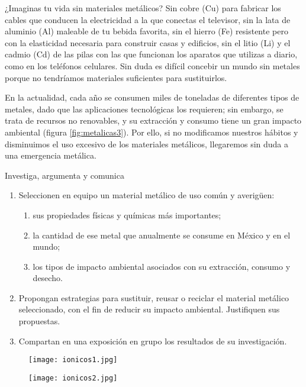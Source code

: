 ¿Imaginas tu vida sin materiales metálicos? Sin cobre (Cu) para fabricar los cables que conducen la
electricidad a la que conectas el televisor, sin la lata de aluminio (Al) maleable de tu bebida
favorita, sin el hierro (Fe) resistente pero con la elasticidad necesaria para construir casas y
edificios, sin el litio (Li) y el cadmio (Cd) de las pilas con las que funcionan los aparatos que
utilizas a diario, como en los teléfonos celulares. Sin duda es difícil concebir un mundo sin metales
porque no tendríamos materiales suficientes para sustituirlos.

En la actualidad, cada año se consumen miles de toneladas de diferentes tipos de metales,
dado que las aplicaciones tecnológicas los requieren; sin embargo, se trata de recursos
no renovables, y su extracción y consumo tiene un gran impacto ambiental (figura \ref{fig:metalicas3}).
Por ello, si no modificamos nuestros hábitos y disminuimos el uso excesivo de los materiales metálicos,
llegaremos sin duda a una emergencia metálica.\\

\noindent
\begin{boxK}
    Investiga, argumenta y comunica
    \begin{enumerate}
        \item Seleccionen en equipo un material metálico de uso común y averigüen:
              \begin{enumerate}
                  \item sus propiedades físicas y químicas más importantes;
                  \item la cantidad de ese metal que anualmente se consume en México y en el mundo;
                  \item los tipos de impacto ambiental asociados con su extracción, consumo y desecho.
              \end{enumerate}
        \item Propongan estrategias para sustituir, reusar o reciclar el material metálico seleccionado,
              con el fin de reducir su impacto ambiental. Justifiquen sus propuestas.
        \item Compartan en una exposición en grupo los resultados de su investigación.
    \end{enumerate}
\end{boxK}

\begin{minipage}{0.45\textwidth}
    \begin{figure}[H]
        \centering
        \texttt{[image: ionicos1.jpg]}
        \label{fig:ionicos1}
    \end{figure}
\end{minipage}\hfill
\begin{minipage}{0.45\textwidth}
    \begin{figure}[H]
        \centering
        \texttt{[image: ionicos2.jpg]}
        \label{fig:ionicos2}
    \end{figure}
\end{minipage}

